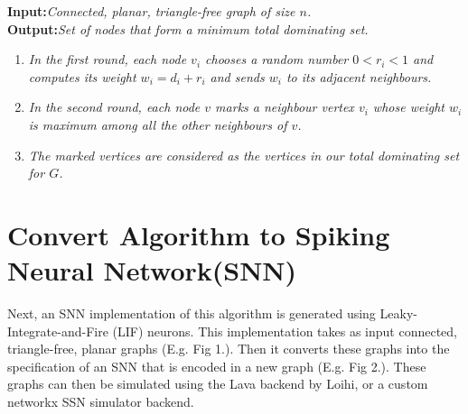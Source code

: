 {%
\textbf{Input:}\textit{Connected, planar, triangle-free graph of size $n$.}\\
\textbf{Output:}\textit{Set of nodes that form a minimum total dominating set.}\\
\vspace{-1.5em}
\begin{enumerate}[noitemsep]
\itemsep-1.5em
\item \textit{In the first round, each node $v_i$ chooses a random number $0<r_i<1$ and computes its weight $w_i=d_i+r_i$ and sends $w_i$ to its adjacent neighbours.}\\
\item \textit{In the second round, each node $v$ marks a neighbour vertex $v_i$ whose weight $w_i$ is maximum among all the other neighbours of $v$.}\\
\vspace{1em}
\item \textit{The marked vertices are considered as the vertices in our total dominating set for $G$.}
\end{enumerate}

\section{Convert Algorithm to Spiking Neural Network(SNN)}\label{subsec:algo_to_snn}
Next, an SNN implementation of this algorithm is generated using Leaky-Integrate-and-Fire (LIF) neurons. This implementation takes as input connected, triangle-free, planar graphs (E.g. Fig 1.). Then it converts these graphs into the specification of an SNN that is encoded in a new graph (E.g. Fig 2.). These graphs can then be simulated using the Lava backend by Loihi, or a custom networkx SSN simulator backend.

}
